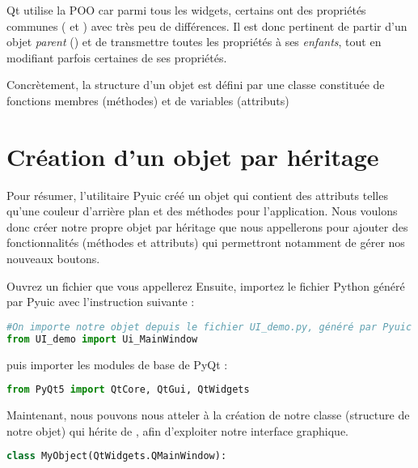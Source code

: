 {


Qt utilise la POO car parmi tous les widgets, certains ont des propriétés communes ( et ) avec très peu de différences. Il est donc pertinent de partir d'un objet \textit{parent} () et de transmettre toutes les propriétés à ses \textit{enfants}, tout en modifiant parfois certaines de ses propriétés. \newline

Concrètement, la structure d'un objet est défini par une classe constituée de fonctions membres (méthodes) et de variables (attributs)

\section{Création d'un objet par héritage}

Pour résumer, l'utilitaire Pyuic créé un objet  qui contient des attributs telles qu'une couleur d'arrière plan et des méthodes pour l'application. \newline
Nous voulons donc créer notre propre objet par héritage que nous appellerons  pour ajouter des fonctionnalités (méthodes et attributs) qui permettront notamment de gérer nos nouveaux boutons. \newline

Ouvrez un fichier que vous appellerez 
Ensuite, importez le fichier Python généré par Pyuic avec l'instruction suivante :

\begin{lstlisting}[language=Python]
#On importe notre objet depuis le fichier UI_demo.py, généré par Pyuic
from UI_demo import Ui_MainWindow
\end{lstlisting}

puis importer les modules de base de PyQt :  
\begin{lstlisting}[language=Python]
from PyQt5 import QtCore, QtGui, QtWidgets
\end{lstlisting}

Maintenant, nous pouvons nous atteler à la création de notre classe  (structure de notre objet) qui hérite de , afin d'exploiter notre interface graphique.


\begin{lstlisting}[language=Python]
class MyObject(QtWidgets.QMainWindow):
\end{lstlisting}

}

